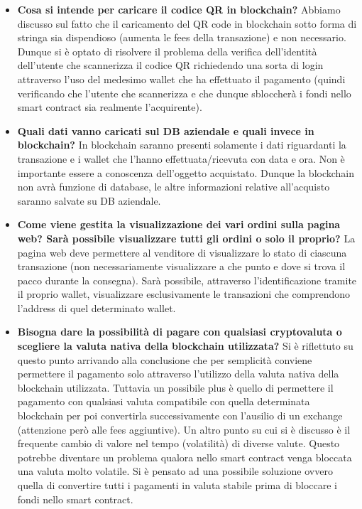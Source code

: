 \documentclass[a4paper, 12pt]{article}
\begin{document}
\begin{itemize}

\item \textbf{Cosa si intende per caricare il codice QR in blockchain?}
Abbiamo discusso sul fatto che il caricamento del QR code in blockchain sotto forma di stringa sia dispendioso (aumenta le fees della transazione) e non 	necessario. Dunque si è optato di risolvere il problema della verifica dell’identità dell’utente che scannerizza il codice QR richiedendo una sorta di login attraverso l’uso del medesimo wallet che ha effettuato il pagamento (quindi verificando che l’utente che scannerizza e che dunque sbloccherà i fondi nello smart contract sia realmente l’acquirente).

\item \textbf{Quali dati vanno caricati sul DB aziendale e quali invece in blockchain?}
In blockchain saranno presenti solamente i dati riguardanti la transazione e i wallet che l’hanno effettuata/ricevuta con data e ora. Non è importante essere a conoscenza dell’oggetto acquistato.
 Dunque la blockchain non avrà funzione di database, le altre informazioni relative all’acquisto saranno salvate su DB aziendale.

\item \textbf{Come viene gestita la visualizzazione dei vari ordini sulla pagina web? Sarà possibile visualizzare tutti gli ordini o solo il proprio?}
La pagina web deve permettere al venditore di visualizzare lo stato di ciascuna transazione (non necessariamente visualizzare a che punto e dove si trova il pacco durante la consegna). Sarà possibile, attraverso l’identificazione tramite il proprio wallet, visualizzare esclusivamente le transazioni che comprendono l’address di quel determinato wallet.

\item \textbf{Bisogna dare la possibilità di pagare con qualsiasi cryptovaluta o scegliere la valuta nativa della blockchain utilizzata?}
Si è riflettuto su questo punto arrivando alla conclusione che per semplicità conviene permettere il pagamento solo attraverso l’utilizzo della valuta nativa della blockchain utilizzata. Tuttavia un possibile plus è quello di permettere il pagamento con qualsiasi valuta compatibile con quella determinata blockchain per poi convertirla successivamente con l’ausilio di un exchange (attenzione però alle fees aggiuntive). 
Un altro punto su cui si è discusso è il frequente cambio di valore nel tempo (volatilità) di diverse valute. Questo potrebbe diventare un problema qualora nello smart contract venga bloccata una valuta molto volatile. Si è pensato ad una possibile soluzione ovvero quella di convertire tutti i pagamenti in valuta stabile prima di bloccare i fondi nello smart contract.
 

\end{itemize}
\end{document}
